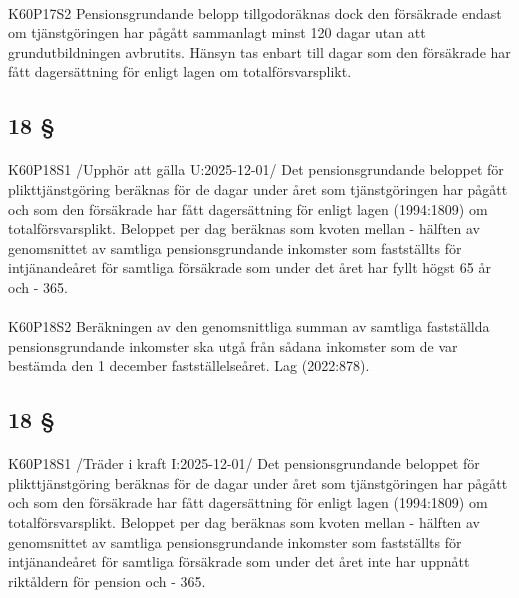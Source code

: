 \documentclass[a4paper,notitlepage,openany,10pt]{book}
\begin{document}
\paragraph*{}
{\tiny K60P17S2}
Pensionsgrundande belopp tillgodoräknas dock den försäkrade endast om tjänstgöringen har pågått sammanlagt minst 120 dagar utan att grundutbildningen avbrutits. Hänsyn tas enbart till dagar som den försäkrade har fått dagersättning för enligt lagen om totalförsvarsplikt.
\subsection*{18 §}
\paragraph*{}
{\tiny K60P18S1}
/Upphör att gälla U:2025-12-01/
Det pensionsgrundande beloppet för plikttjänstgöring beräknas för de dagar under året som tjänstgöringen har pågått och som den försäkrade har fått dagersättning för enligt lagen (1994:1809) om totalförsvarsplikt. Beloppet per dag beräknas som kvoten mellan
\newline - hälften av genomsnittet av samtliga pensionsgrundande inkomster som fastställts för intjänandeåret för samtliga försäkrade som under det året har fyllt högst 65 år och
\newline - 365.
\paragraph*{}
{\tiny K60P18S2}
Beräkningen av den genomsnittliga summan av samtliga fastställda pensionsgrundande inkomster ska utgå från sådana inkomster som de var bestämda den 1 december fastställelseåret.
Lag (2022:878).
\subsection*{18 §}
\paragraph*{}
{\tiny K60P18S1}
/Träder i kraft I:2025-12-01/
Det pensionsgrundande beloppet för plikttjänstgöring beräknas för de dagar under året som tjänstgöringen har pågått och som den försäkrade har fått dagersättning för enligt lagen (1994:1809) om totalförsvarsplikt. Beloppet per dag beräknas som kvoten mellan
\newline - hälften av genomsnittet av samtliga pensionsgrundande inkomster som fastställts för intjänandeåret för samtliga försäkrade som under det året inte har uppnått riktåldern för pension och
\newline - 365.
\end{document}
